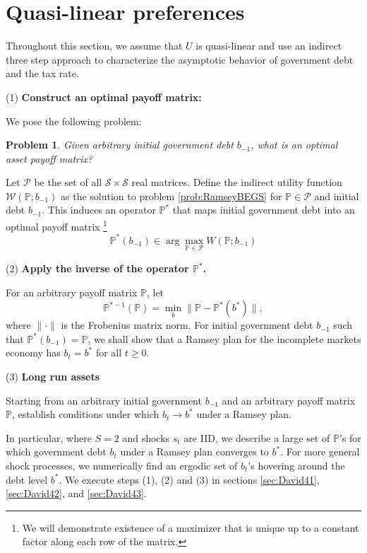 \documentclass[12pt]{article}
\newtheorem{problem}[theorem]{Problem}
\begin{document}
\section{Quasi-linear preferences}

Throughout this section, we assume that $U$ is quasi-linear and use an indirect three step approach to  characterize  the asymptotic behavior of government  debt and the tax rate.



\noindent (1) \textbf{Construct  an optimal payoff matrix:}

We pose the following problem:
\begin{problem}\label{prob:PPoperator}
 Given arbitrary initial government debt $b_{-1}$, what is an optimal asset payoff matrix?
\end{problem}
\noindent  Let $\mathcal P$ be the set of all $\mathcal S\times \mathcal S$ real matrices.  Define the indirect utility function $\mathcal W(\mathbb P;b_{-1})$ as the solution to problem \ref{prob:RamseyBEGS} for $\mathbb P \in \mathcal P$ and initial debt $b_{-1}$.  This induces an operator $\mathbb P^*$ that maps initial government debt into an optimal payoff matrix \footnote{We will demonstrate existence of a maximizer that is unique up to a constant factor along each row of the matrix.}
\[
	\mathbb P^*(b_{-1}) \in \arg\max_{\mathbb P\in \mathcal P} W(\mathbb P; b_{-1})
\]



\noindent (2) \textbf{Apply the inverse of the operator $\mathbb{P}^*$.}

For an arbitrary payoff matrix $\mathbb{P}$,  let
\begin{equation}\label{eqn:invPoperator}\mathbb{P}^{* -1}(\mathbb{P}) =\min_{b}\|\mathbb{P}-\mathbb{P}^*(b^*)\|,
\end{equation}where $\|\cdot\|$ is the Frobenius matrix norm.  For initial government debt $b_{-1}$ such that $\mathbb P^*(b_{-1}) = \mathbb P$, we shall show that a Ramsey plan for the incomplete markets economy has $b_t = b^*$ for all $t \geq 0$.


\noindent (3) \textbf{Long run assets}

Starting from an arbitrary initial government $b_{-1}$ and an arbitrary payoff matrix $\mathbb{P}$,  establish conditions under  which $b_t \to b^*$ under a Ramsey plan.


In particular, where $S=2$ and shocks $s_t$ are IID,  we describe a large set of  $\mathbb{P}$'s for which government debt $b_t$  under a Ramsey plan converges to $b^*$.  For more general shock processes, we numerically find  an ergodic set of $b_t$'s hovering around the debt level $b^*$.  We execute steps (1), (2) and (3) in sections \ref{sec:David41}, \ref{sec:David42}, and \ref{sec:David43}. %
\end{document}
